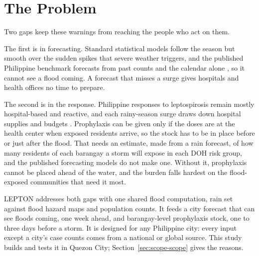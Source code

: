 \section{The Problem}\label{sec:problem}

Two gaps keep these warnings from reaching the people who act on them.

The first is in forecasting. Standard statistical models follow the season but smooth over the
sudden spikes that severe weather triggers, and the published Philippine benchmark forecasts
from past counts and the calendar alone \parencite{latigay2026}, so it cannot see a flood
coming. A forecast that misses a surge gives hospitals and health offices no time to prepare.

The second is in the response. Philippine responses to leptospirosis remain mostly
hospital-based and reactive, and each rainy-season surge draws down hospital supplies and
budgets \parencite{interior2025}. Prophylaxis can be given only if the doses are at the health
center when exposed residents arrive, so the stock has to be in place before or just after
the flood. That needs an estimate, made from a rain forecast, of how many residents of each
barangay a storm will expose in each DOH risk group, and the published forecasting models do
not make one. Without it, prophylaxis cannot be placed ahead of the water, and the burden falls
hardest on the flood-exposed communities that need it most.

LEPTON addresses both gaps with one shared flood computation, rain set against flood hazard
maps and population counts. It feeds a city forecast that can see floods coming, one week
ahead, and barangay-level prophylaxis stock, one to three days before a storm. It is designed
for any Philippine city: every input except a city's case counts comes from a national or
global source. This study builds and tests it in Quezon City; Section~\ref{sec:scope-scope}
gives the reasons.
